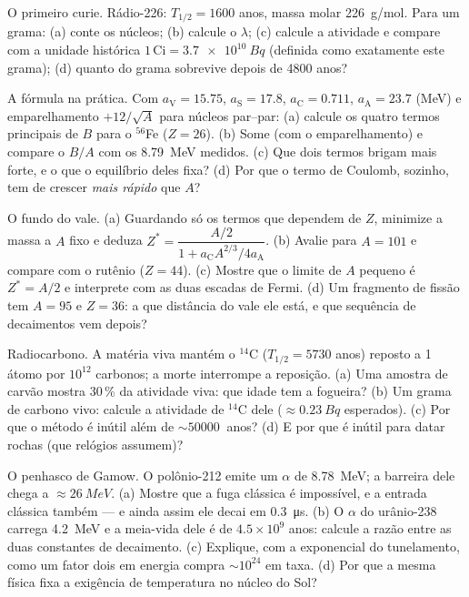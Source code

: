 \begin{exercise}[$\star$]\label{exo:b3:nuclear-physics:4}
O primeiro curie. Rádio-226: $T_{1/2} = 1600$ anos, massa molar
\qty{226}{g/mol}. Para um grama: (a) conte os núcleos; (b) calcule
o $\lambda$; (c) calcule a atividade e compare com a unidade histórica
$1\,\text{Ci} = \qty{3.7e10}{Bq}$ (definida como exatamente este
grama); (d) quanto do grama sobrevive depois de 4800 anos?
\end{exercise}

\begin{exercise}[$\star\star$]\label{exo:b3:nuclear-physics:5}
A fórmula na prática. Com $a_{\text{V}} = 15.75$,
$a_{\text{S}} = 17.8$, $a_{\text{C}} = 0.711$,
$a_{\text{A}} = 23.7$ (\unit{MeV}) e emparelhamento
$+12/\sqrt A$ para núcleos par--par: (a) calcule os quatro termos
principais de $B$ para o $^{56}$Fe ($Z = 26$). (b) Some (com o
emparelhamento) e compare o $B/A$ com os \qty{8.79}{MeV} medidos. (c)
Que dois termos brigam mais forte, e o que o equilíbrio deles fixa? (d)
Por que o termo de Coulomb, sozinho, tem de crescer \emph{mais rápido}
que $A$?
\end{exercise}

\begin{exercise}[$\star\star$]\label{exo:b3:nuclear-physics:6}
O fundo do vale. (a) Guardando só os termos que dependem de $Z$,
minimize a massa a $A$ fixo e deduza
$Z^* = \dfrac{A/2}{1 + a_{\text{C}}A^{2/3}/4a_{\text{A}}}$. (b)
Avalie para $A = 101$ e compare com o rutênio ($Z = 44$).
(c) Mostre que o limite de $A$ pequeno é $Z^* = A/2$ e interprete com
as duas escadas de Fermi. (d) Um fragmento de fissão tem $A = 95$ e
$Z = 36$: a que distância do vale ele está, e que sequência de
decaimentos vem depois?
\end{exercise}

\begin{exercise}[$\star\star$]\label{exo:b3:nuclear-physics:7}
Radiocarbono. A matéria viva mantém o $^{14}$C
($T_{1/2} = 5730$ anos) reposto a 1 átomo por $10^{12}$
carbonos; a morte interrompe a reposição. (a) Uma amostra de carvão
mostra 30\,\% da atividade viva: que idade tem a fogueira? (b) Um grama
de carbono vivo: calcule a atividade de $^{14}$C dele
($\approx\qty{0.23}{Bq}$ esperados). (c) Por que o método é inútil
além de $\sim\qty{50000}{}$ anos? (d) E por que é inútil para
datar rochas (que relógios assumem)?
\end{exercise}

\begin{exercise}[$\star\star$]\label{exo:b3:nuclear-physics:8}
O penhasco de Gamow. O polônio-212 emite um $\alpha$ de \qty{8.78}{MeV};
a barreira dele chega a $\approx\qty{26}{MeV}$. (a) Mostre que a fuga
clássica é impossível, e a entrada clássica também --- e ainda assim ele
decai em \qty{0.3}{\micro s}. (b) O $\alpha$ do urânio-238 carrega
\qty{4.2}{MeV} e a meia-vida dele é de $4.5\times10^9$ anos:
calcule a razão entre as duas constantes de decaimento. (c) Explique, com
a exponencial do tunelamento, como um fator dois em energia compra
$\sim10^{24}$ em taxa. (d) Por que a mesma física fixa a exigência de
temperatura no núcleo do Sol?
\end{exercise}

